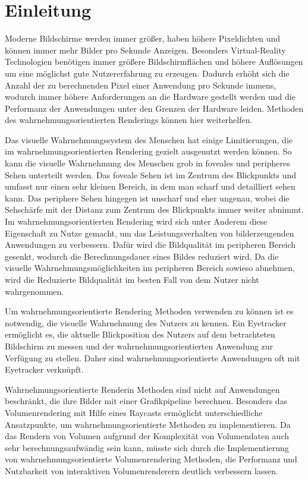 \chapter{Einleitung}\label{chap::intro}
Moderne Bildschirme werden immer größer, haben höhere Pixeldichten und können immer mehr Bilder pro Sekunde Anzeigen.
Besonders Virtual-Reality Technologien benötigen immer größere Bildschirmflächen und höhere Auflösungen um eine möglichst gute Nutzererfahrung zu erzeugen.
Dadurch erhöht sich die Anzahl der zu berechnenden Pixel einer Anwendung pro Sekunde immens, wodurch immer höhere Anforderungen an die Hardware gestellt werden und die Performanz der Anwendungen unter den Grenzen der Hardware leiden. 
Methoden des wahrnehmungsorientierten Renderings können hier weiterhelfen. 

Das visuelle Wahrnehmungssystem des Menschen hat einige Limitierungen, die im wahrnehmungsorientierten Rendering gezielt ausgenutzt werden können.
So kann die visuelle Wahrnehmung des Menschen grob in foveales und peripheres Sehen unterteilt werden.
Das foveale Sehen ist im Zentrum des Blickpunkts und umfasst nur einen sehr kleinen Bereich, in dem man scharf und detailliert sehen kann.
Das periphere Sehen hingegen ist unscharf und eher ungenau, wobei die Sehschärfe mit der Distanz zum Zentrum  des Blickpunkts immer weiter abnimmt.
Im wahrnehmungsorientierten Rendering wird sich unter Anderem diese Eigenschaft zu Nutze gemacht, um das Leistungsverhalten von bilderzeugenden Anwendungen zu verbessern.
Dafür wird die Bildqualität im peripheren Bereich gesenkt, wodurch die Berechnungsdauer eines Bildes reduziert wird.
Da die visuelle Wahrnehmungsmöglichkeiten im peripheren Bereich sowieso abnehmen, wird die Reduzierte Bildqualität im besten Fall von dem Nutzer nicht wahrgenommen.

Um wahrnehmungsorientierte Rendering Methoden verwenden zu können ist es notwendig, die visuelle Wahrnehmung des Nutzers zu kennen.
Ein Eyetracker ermöglicht es, die aktuelle Blickposition des Nutzers auf dem betrachteten Bildschirm zu messen und der wahrnehmungsorientierten Anwendung zur Verfügung zu stellen.
Daher sind wahrnehmungsorientierte Anwendungen oft mit Eyetracker verknüpft.

Wahrnehmungsorientierte Renderin Methoden sind nicht auf Anwendungen beschränkt, die ihre Bilder mit einer Grafikpipeline berechnen.
Besonders das Volumenrendering mit Hilfe eines Raycasts ermöglicht unterschiedliche Ansatzpunkte, um wahrnehmungsorientierte Methoden zu implementieren.
Da das Rendern von Volumen aufgrund der Komplexität von Volumendaten auch sehr berechnungsaufwändig sein kann, müsste sich durch die Implementierung von wahrnehmungsorientierte Volumenrendering Methoden, die Performanz und Nutzbarkeit von interaktiven Volumenrenderern deutlich verbessern lassen.


